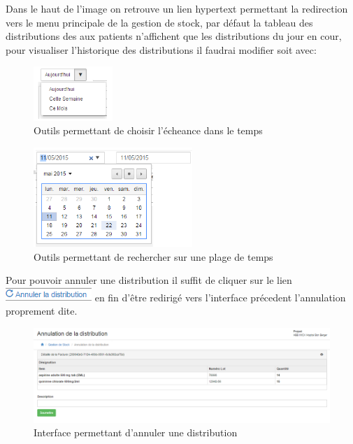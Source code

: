 \documentclass[12pt,a4paper]{report}
\begin{document}
Dans le haut de l'image on retrouve un lien hypertext permettant la redirection vers le menu principale de la gestion de stock, par défaut la tableau des distributions des aux patients n'affichent que les distributions du jour en cour, pour visualiser l'historique des distributions il faudrai modifier soit avec: 

\begin{figure}[h]
\begin{center}
\includegraphics[width=3cm]{pic/SelectJour.png}
\end{center}
\caption{Outils permettant de choisir l'écheance dans le temps}
\label{Outils permettant de choisir l'écheance dans le temps}
\end{figure} 

\begin{figure}[h]
\begin{center}
\includegraphics[width=6cm]{pic/SelecPlageDate.png}
\end{center}
\caption{Outils permettant de rechercher sur une plage de temps}
\label{Outils permettant de rechercher sur une plage de temps}
\end{figure} 

\newpage
Pour pouvoir annuler une distribution il suffit de cliquer sur le lien \includegraphics[scale=0.7]{pic/AnnulerDistribution.png} en fin d'être redirigé vers l'interface précedent l'annulation proprement dite.

\begin{figure}[h]
\begin{center}
\includegraphics[width=14cm]{pic/CancelDistribution.png}
\end{center}
\caption{Interface permettant d'annuler une distribution}
\label{Interface permettant d'annuler une distribution}
\end{figure}
\end{document}
